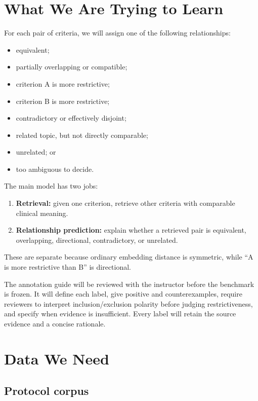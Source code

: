 \documentclass[11pt]{article}
\begin{document}
\section{What We Are Trying to Learn}

For each pair of criteria, we will assign one of the following relationships:

\begin{itemize}
    \item equivalent;
    \item partially overlapping or compatible;
    \item criterion A is more restrictive;
    \item criterion B is more restrictive;
    \item contradictory or effectively disjoint;
    \item related topic, but not directly comparable;
    \item unrelated; or
    \item too ambiguous to decide.
\end{itemize}

The main model has two jobs:

\begin{enumerate}
    \item \textbf{Retrieval:} given one criterion, retrieve other criteria with comparable clinical meaning.
    \item \textbf{Relationship prediction:} explain whether a retrieved pair is equivalent, overlapping, directional, contradictory, or unrelated.
\end{enumerate}

These are separate because ordinary embedding distance is symmetric, while ``A is more restrictive than B'' is directional.

The annotation guide will be reviewed with the instructor before the benchmark is frozen. It will define each label, give positive and counterexamples, require reviewers to interpret inclusion/exclusion polarity before judging restrictiveness, and specify when evidence is insufficient. Every label will retain the source evidence and a concise rationale.

\section{Data We Need}

\subsection{Protocol corpus}
\end{document}

